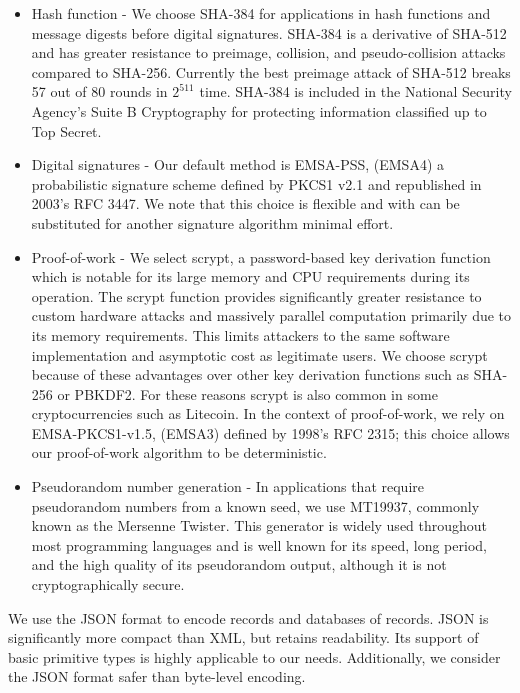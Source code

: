 \begin{itemize}
	\item Hash function - We choose SHA-384 for applications in hash functions and message digests before digital signatures. SHA-384 is a derivative of SHA-512 and has greater resistance to preimage, collision, and pseudo-collision attacks compared to SHA-256. Currently the best preimage attack of SHA-512 breaks 57 out of 80 rounds in $ 2^{511} $ time.\cite{li2012converting} SHA-384 is included in the National Security Agency's Suite B Cryptography for protecting information classified up to Top Secret.
	\item Digital signatures - Our default method is EMSA-PSS, (EMSA4) a probabilistic signature scheme defined by PKCS1 v2.1 and republished in 2003's RFC 3447. We note that this choice is flexible and with can be substituted for another signature algorithm  minimal effort.
	\item Proof-of-work - We select scrypt, a password-based key derivation function which is notable for its large memory and CPU requirements during its operation. The scrypt function provides significantly greater resistance to custom hardware attacks and massively parallel computation primarily due to its memory requirements. This limits attackers to the same software implementation and asymptotic cost as legitimate users.\cite{percival2009stronger}\cite{percival2012scrypt} We choose scrypt because of these advantages over other key derivation functions such as SHA-256 or PBKDF2. For these reasons scrypt is also common in some cryptocurrencies such as Litecoin. In the context of proof-of-work, we rely on EMSA-PKCS1-v1.5, (EMSA3) defined by 1998's RFC 2315; this choice allows our proof-of-work algorithm to be deterministic.
	\item Pseudorandom number generation - In applications that require pseudorandom numbers from a known seed, we use MT19937, commonly known as the Mersenne Twister. This generator is widely used throughout most programming languages and is well known for its speed, long period, and the high quality of its pseudorandom output, although it is not cryptographically secure.\cite{matsumoto1998mersenne}
\end{itemize}

We use the JSON format to encode records and databases of records. JSON is significantly more compact than XML, but retains readability. Its support of basic primitive types is highly applicable to our needs. Additionally, we consider the JSON format safer than byte-level encoding.

